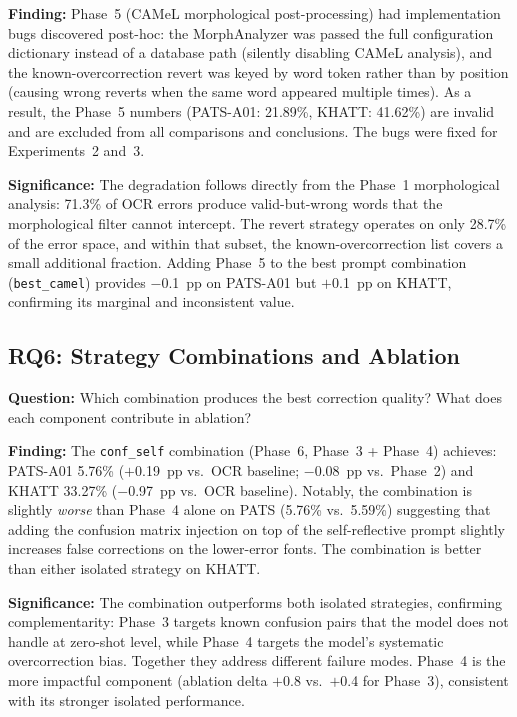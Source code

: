 \textbf{Finding:} Phase~5 (CAMeL morphological post-processing) had
implementation bugs discovered post-hoc: the MorphAnalyzer was passed the
full configuration dictionary instead of a database path (silently disabling
CAMeL analysis), and the known-overcorrection revert was keyed by word token
rather than by position (causing wrong reverts when the same word appeared
multiple times). As a result, the Phase~5 numbers (PATS-A01: 21.89\%,
KHATT: 41.62\%) are invalid and are excluded from all comparisons and
conclusions. The bugs were fixed for Experiments~2 and~3.

\textbf{Significance:} The degradation follows directly from the Phase~1
morphological analysis: 71.3\% of OCR errors produce valid-but-wrong words
that the morphological filter cannot intercept. The revert strategy operates
on only 28.7\% of the error space, and within that subset, the known-overcorrection
list covers a small additional fraction. Adding Phase~5 to the best prompt
combination (\texttt{best\_camel}) provides $-$0.1~pp on PATS-A01 but $+$0.1~pp
on KHATT, confirming its marginal and inconsistent value.

\subsection*{RQ6: Strategy Combinations and Ablation}

\textbf{Question:} Which combination produces the best correction quality?
What does each component contribute in ablation?

\textbf{Finding:} The \texttt{conf\_self} combination (Phase~6, Phase~3 +
Phase~4) achieves: PATS-A01 5.76\% ($+$0.19~pp vs.\ OCR baseline;
$-$0.08~pp vs.\ Phase~2) and KHATT 33.27\% ($-$0.97~pp vs.\ OCR baseline).
Notably, the combination is slightly \emph{worse} than Phase~4 alone on PATS
(5.76\% vs.\ 5.59\%) suggesting that adding the confusion matrix injection
on top of the self-reflective prompt slightly increases false corrections
on the lower-error fonts. The combination is better than either isolated
strategy on KHATT.

\textbf{Significance:} The combination outperforms both isolated strategies,
confirming complementarity: Phase~3 targets known confusion pairs that the
model does not handle at zero-shot level, while Phase~4 targets the model's
systematic overcorrection bias. Together they address different failure modes.
Phase~4 is the more impactful component (ablation delta $+$0.8 vs.\ $+$0.4
for Phase~3), consistent with its stronger isolated performance.


